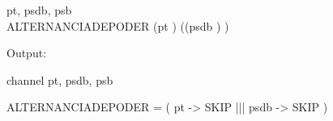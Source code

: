 \begin{circus}
\circchannel pt, psdb, psb \\
\circprocess ALTERNANCIADEPODER \circdef \circbegin
	\circspot
	  (pt \then \Skip)
	  \interleave ((psdb \then \Skip)
	  )
	  \\
\circend
\end{circus}


Output:

channel pt, psdb, psb

ALTERNANCIADEPODER = 
	( pt -> SKIP
		 ||| psdb -> SKIP )

